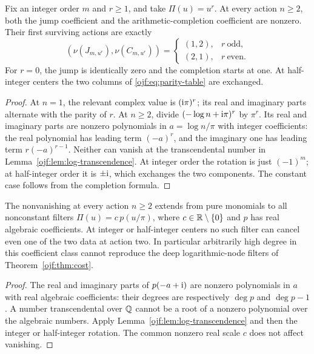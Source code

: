 \begin{theorem}
\label{ojf:thm:parity}
Fix an integer order $m$ and $r\ge1$, and take $\Pi(u)=u^r$.
At every action $n\ge2$, both the jump coefficient and the
arithmetic-completion coefficient are nonzero. Their first surviving
actions are exactly
\begin{equation}\label{ojf:eq:parity-table}
 (\nu(J_{m,u^r}),\nu(C_{m,u^r}))=
 \begin{cases}(1,2),&r\ \text{odd},\\(2,1),&r\ \text{even}.
 \end{cases}
\end{equation}
For $r=0$, the jump is identically zero and the completion starts at
one. At half-integer centers the two columns of
\eqref{ojf:eq:parity-table} are exchanged.
\end{theorem}
\begin{proof}
At $n=1$, the relevant complex value is $(\mathrm{i}\pi)^r$; its real and
imaginary parts alternate with the parity of $r$. At $n\ge2$, divide
$(-\log n+\mathrm{i}\pi)^r$ by $\pi^r$. Its real and imaginary parts are
nonzero polynomials in $a=\log n/\pi$ with integer coefficients:
the real polynomial has leading term $(-a)^r$, and the imaginary one
has leading term $r(-a)^{r-1}$. Neither can vanish at the transcendental
number in Lemma~\ref{ojf:lem:log-transcendence}. At integer order the rotation
is just $(-1)^m$; at half-integer order it is $\pm\mathrm{i}$, which exchanges
the two components. The constant case follows from the completion formula.
\end{proof}

\begin{corollary}
\label{ojf:cor:algebraic-rigidity}
The nonvanishing at every action $n\ge2$ extends from pure monomials to
all nonconstant filters
$\Pi(u)=c\,p(u/\pi)$, where $c\in\mathbb R\setminus\{0\}$ and $p$ has
real algebraic coefficients. At integer or half-integer centers no such
filter can cancel even one of the two data at action two. In particular
arbitrarily high degree in this coefficient class cannot reproduce the
deep logarithmic-node filters of Theorem~\ref{ojf:thm:cost}.
\end{corollary}
\begin{proof}
The real and imaginary parts of $p(-a+\mathrm{i})$ are nonzero polynomials in
$a$ with real algebraic coefficients: their degrees are respectively
$\deg p$ and $\deg p-1$. A number transcendental over $\mathbb{Q}$ cannot be
a root of a nonzero polynomial over the algebraic numbers. Apply
Lemma~\ref{ojf:lem:log-transcendence} and then the integer or half-integer
rotation. The common nonzero real scale $c$ does not affect vanishing.
\end{proof}

